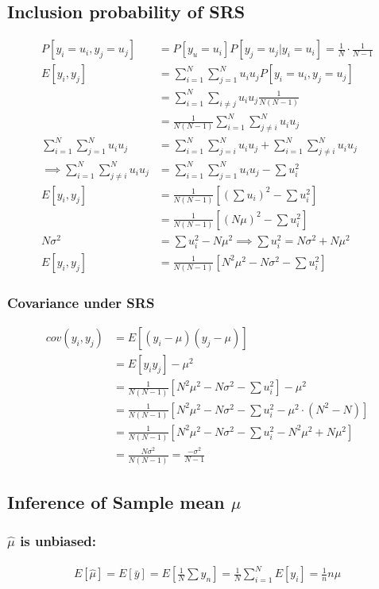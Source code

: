 \documentclass{article}
\theoremstyle{definition}
\theoremstyle{thrm}
\theoremstyle{lma}
\theoremstyle{ppst}
\theoremstyle{crlr}
\begin{document}
\subsection{Inclusion probability of SRS}
\begin{align*}
	P[y_i=u_i, y_j=u_j] &= P[y_u=u_i]P[y_j=u_j|y_i=u_i] = \frac{1}{N}\cdot\frac{1}{N-1}\\
	E[y_i,y_j] &= \sum_{i=1}^N\sum_{j=1}^N u_iu_jP[y_i=u_i, y_j=u_j]\\
	&= \sum_{i=1}^N\sum_{i\neq j}u_iu_j\frac{1}{N(N-1)}\\
	&= \frac{1}{N(N-1)}\sum_{i=1}^N\sum_{j\neq i}^Nu_iu_j\\
	\sum_{i=1}^N\sum_{j=1}^Nu_iu_j& = \sum_{i=1}^N\sum_{j=i}^Nu_iu_j + \sum_{i=1}^N\sum_{j\neq i}^Nu_iu_j\\
	\implies \sum_{i=1}^N\sum_{j\neq i}^Nu_iu_j &= \sum_{i=1}^N\sum_{j=1}^Nu_iu_j-\sum u_i^2\\
	E[y_i,y_j] &= \frac{1}{N(N-1)}[(\sum u_i)^2-\sum u_i^2]\\
	&= \frac{1}{N(N-1)}[(N\mu)^2-\sum u_i^2]\\
	N\sigma^2 &= \sum u_i^2 - N\mu^2 \implies \sum u_i^2 = N\sigma^2+N\mu^2\\
	E[y_i,y_j] &= \frac{1}{N(N-1)}[N^2\mu^2-N\sigma^2-\sum u_i^2]
\end{align*}
\subsubsection{Covariance under SRS}
\begin{align*}
	cov(y_i, y_j) &= E[(y_i-\mu)(y_j-\mu)]\\
	 &= E[y_iy_j]-\mu^2\\
	 &= \frac{1}{N(N-1)}[N^2\mu^2-N\sigma^2-\sum u_i^2] - \mu^2\\
	 &= \frac{1}{N(N-1)}[N^2\mu^2-N\sigma^2-\sum u_i^2-\mu^2\cdot(N^2-N)] \\
	 &= \frac{1}{N(N-1)}[N^2\mu^2-N\sigma^2-\sum u_i^2 - N^2\mu^2+N\mu^2] \\
	 &=\frac{N\sigma^2}{N(N-1)} = \frac{-\sigma^2}{N-1}
\end{align*}

\subsection{Inference of Sample mean $\mu$}
\subsubsection{$\hat{\mu}$ is unbiased: }
\begin{align*}
	E[\hat{\mu}] = E[\bar{y}] = E[\frac{1}{N}\sum y_n] = \frac{1}{N}\sum_{i=1}^NE[y_i] = \frac{1}{n}n\mu
\end{align*}
\end{document}
